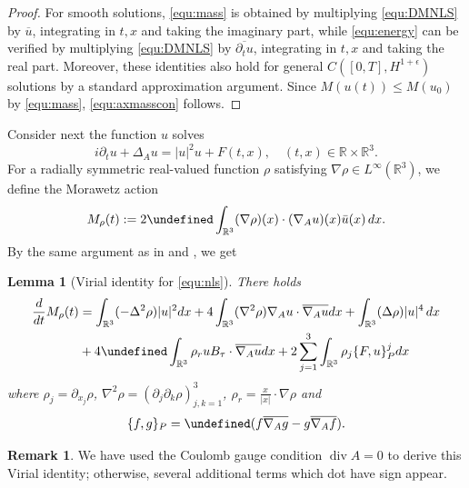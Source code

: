 \documentclass[10pt%
]{amsart}
\numberwithin{equation}{section}
\newcommand{\pa}{\partial}
\let\Re=\undefined\DeclareMathOperator*{\Re}{Re}
\let\Im=\undefined\DeclareMathOperator*{\Im}{Im}
\newcommand{\R}{\mathbb{R}}
\newtheorem{lemma}[theorem]{Lemma}
\theoremstyle{definition}
\newtheorem{remark}[theorem]{Remark}
\def\div{\mathop{\mathrm{div}}\nolimits}
\begin{document}
\begin{proof}
	For smooth solutions, \eqref{equ:mass} is obtained by multiplying \eqref{equ:DMNLS} by $\overline u$, integrating in $t,x$ and taking the imaginary part, while \eqref{equ:energy} can be verified by multiplying \eqref{equ:DMNLS} by $\overline{\partial_t u}$, integrating in $t,x$ and taking the real part. Moreover, these identities also hold for general $C([0,T], H^{1+\epsilon})$ solutions by a standard approximation argument. Since $M(u(t))\le M(u_0)$ by \eqref{equ:mass}, \eqref{equ:axmasscon} follows. 
\end{proof}	

Consider next the function $u$ solves
\begin{equation}\label{equ:nls}
	i\pa_tu+\Delta_A u=|u|^2u+F(t,x),\quad (t,x)\in\R\times\R^3.
\end{equation}
For a radially symmetric real-valued function $\rho$ satisfying $\nabla \rho\in L^\infty(\R^3)$, we define the Morawetz action
\begin{equation}\label{equ:moract}
	M_\rho(t):=2\Im \int_{\R^3}(\nabla \rho)(x)\cdot (\nabla_A
	u)(x)\bar{u}(x)\,dx.
\end{equation}
By the same argument as in \cite[Theorem 1.2]{Fanelli-Vega} and \cite[Lemma 3.1]{CCL}, we get
\begin{lemma}[Virial identity for \eqref{equ:nls}]\label{lem:moriden}
	There holds
	\begin{align*}
		\frac{d}{dt}M_\rho(t)&=\int_{\R^3}(-\Delta^2\rho)|u|^2dx
		+4\int_{\R^3}(\nabla^2\rho) \nabla_Au\cdot\overline{\nabla_Au}dx
		+\int_{\R^3}(\Delta\rho)|u|^4\,dx\\
		&+4\Im \int_{\R^3}\rho_ruB_\tau \cdot \overline{\nabla_A u}dx+2\sum_{j=1}^3\int_{\R^3}\rho_j \{F,u\}_P^jdx
	\end{align*}
	where $\rho_j=\partial_{x_j}\rho$, $\nabla^2\rho=(\partial_j\partial_k\rho)_{j,k=1}^3$, $\rho_r=\frac{x}{|x|}\cdot\nabla\rho$ and
	$$\{f,g\}_P=\Re(f\overline{\nabla_A g}-g\overline{\nabla_Af}).$$ %
\end{lemma}

\begin{remark}
	We have used the Coulomb gauge condition $\div A=0$ to derive this Virial identity; otherwise, several  additional terms which dot have sign appear. 
\end{remark}
\end{document}
